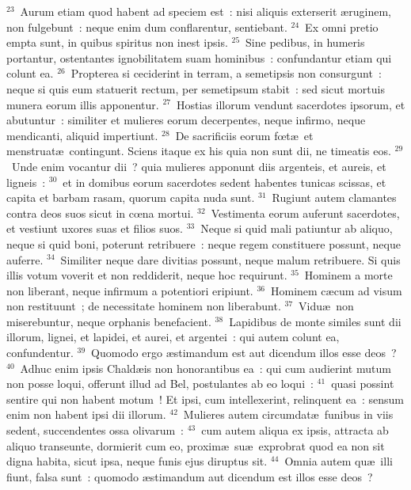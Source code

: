 ${}^{23}$~Aurum etiam quod habent ad speciem est~: nisi aliquis exterserit \ae ruginem, non fulgebunt~: neque enim dum conflarentur, sentiebant.
${}^{24}$~Ex omni pretio empta sunt, in quibus spiritus non inest ipsis.
${}^{25}$~Sine pedibus, in humeris portantur, ostentantes ignobilitatem suam hominibus~: confundantur etiam qui colunt ea.
${}^{26}$~Propterea si ceciderint in terram, a semetipsis non consurgunt~: neque si quis eum statuerit rectum, per semetipsum stabit~: sed sicut mortuis munera eorum illis apponentur.
${}^{27}$~Hostias illorum vendunt sacerdotes ipsorum, et abutuntur~: similiter et mulieres eorum decerpentes, neque infirmo, neque mendicanti, aliquid impertiunt.
${}^{28}$~De sacrificiis eorum fœt\ae\ et menstruat\ae\ contingunt. Sciens itaque ex his quia non sunt dii, ne timeatis eos.
${}^{29}$~Unde enim vocantur dii~? quia mulieres apponunt diis argenteis, et aureis, et ligneis~:
${}^{30}$~et in domibus eorum sacerdotes sedent habentes tunicas scissas, et capita et barbam rasam, quorum capita nuda sunt.
${}^{31}$~Rugiunt autem clamantes contra deos suos sicut in cœna mortui.
${}^{32}$~Vestimenta eorum auferunt sacerdotes, et vestiunt uxores suas et filios suos.
${}^{33}$~Neque si quid mali patiuntur ab aliquo, neque si quid boni, poterunt retribuere~: neque regem constituere possunt, neque auferre.
${}^{34}$~Similiter neque dare divitias possunt, neque malum retribuere. Si quis illis votum voverit et non reddiderit, neque hoc requirunt.
${}^{35}$~Hominem a morte non liberant, neque infirmum a potentiori eripiunt.
${}^{36}$~Hominem c\ae cum ad visum non restituunt~; de necessitate hominem non liberabunt.
${}^{37}$~Vidu\ae\ non miserebuntur, neque orphanis benefacient.
${}^{38}$~Lapidibus de monte similes sunt dii illorum, lignei, et lapidei, et aurei, et argentei~: qui autem colunt ea, confundentur.
${}^{39}$~Quomodo ergo \ae stimandum est aut dicendum illos esse deos~?
${}^{40}$~Adhuc enim ipsis Chald\ae is non honorantibus ea~: qui cum audierint mutum non posse loqui, offerunt illud ad Bel, postulantes ab eo loqui~:
${}^{41}$~quasi possint sentire qui non habent motum~! Et ipsi, cum intellexerint, relinquent ea~: sensum enim non habent ipsi dii illorum.
${}^{42}$~Mulieres autem circumdat\ae\ funibus in viis sedent, succendentes ossa olivarum~:
${}^{43}$~cum autem aliqua ex ipsis, attracta ab aliquo transeunte, dormierit cum eo, proxim\ae\ su\ae\ exprobrat quod ea non sit digna habita, sicut ipsa, neque funis ejus diruptus sit.
${}^{44}$~Omnia autem qu\ae\ illi fiunt, falsa sunt~: quomodo \ae stimandum aut dicendum est illos esse deos~?


